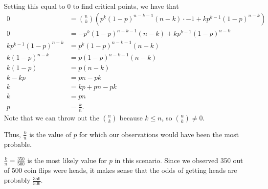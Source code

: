 \documentclass[12pt]{article}
\begin{document}
    Setting this equal to 0 to find critical points, we have that \begin{align*}
        0                   &= {n \choose k}(p^k(1-p)^{n-k-1}(n-k)\cdot-1+kp^{k-1}(1-p)^{n-k}) \\
        0                   &= -p^k(1-p)^{n-k-1}(n-k) + kp^{k-1}(1-p)^{n-k} \\
        kp^{k-1}(1-p)^{n-k} &= p^k(1-p)^{n-k-1}(n-k) \\
        k(1-p)^{n-k}        &= p(1-p)^{n-k-1}(n-k) \\
        k(1-p)              &= p(n-k) \\
        k - kp              &= pn - pk \\
        k                   &= kp + pn - pk \\
        k                   &= pn \\
        p                   &= \frac kn.
    \end{align*} Note that we can throw out the ${n \choose k}$ because $k \leq n$, so ${n \choose k} \neq 0$.

    Thus, $\frac kn$ is the value of $p$ for which our observations would have been the most probable.

\medskip
{}

    $\frac kn = \frac{350}{500}$ is the most likely value for $p$ in this scenario. Since we observed 350 out of 500 coin flips were heads, it makes sense that the odds of getting heads are probably $\frac{350}{500}$.
\end{document}
